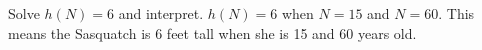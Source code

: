 {Solve $h(N) = 6$ and interpret.}
{$h(N) = 6$ when $N = 15$ and $N=60$.  This means the Sasquatch is 6 feet tall when she is 15 and 60 years old.}